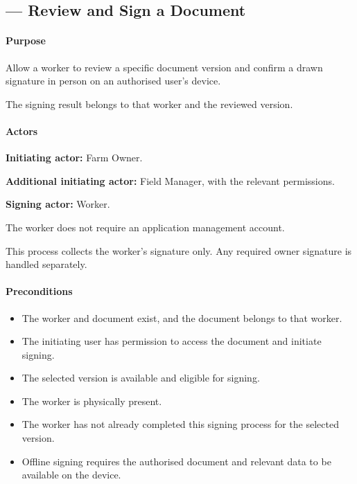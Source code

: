 \subsection{ --- Review and Sign a Document}
\label{uc:14}

\paragraph{Purpose}

Allow a worker to review a specific document version
and confirm a drawn signature in person
on an authorised user's device.

The signing result belongs to that worker
and the reviewed version.


\paragraph{Actors}

\textbf{Initiating actor:} Farm Owner.

\textbf{Additional initiating actor:} Field Manager,
with the relevant permissions.

\textbf{Signing actor:} Worker.

The worker does not require
an application management account.

This process collects the worker's signature only.
Any required owner signature is handled separately.

\paragraph{Preconditions}

\begin{itemize}
    \item The worker and document exist, and the document belongs to that worker.
    \item The initiating user has permission
    to access the document and initiate signing.
    \item The selected version is available
    and eligible for signing.
    \item The worker is physically present.
    \item The worker has not already completed
    this signing process for the selected version.
    \item Offline signing requires the authorised
    document and relevant data
    to be available on the device.
\end{itemize}

